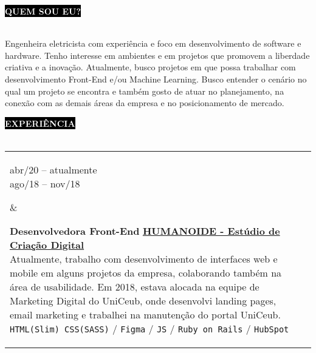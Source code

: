\documentclass[10pt,A4]{article}
\makeatletter
\newcounter{a}
\newcounter{b}
\newcounter{c}
\newcommand{\cvsection}[1] {
	\textcolor{white}{\MakeUppercase{\textbf{#1}}}
}
\newcommand{\cvsect}[1]{
	\colorbox{black}{{\cvsection{#1}}}\\\\%
}
\newenvironment{entrylist}{%
	\begin{tabular*}{\textwidth}[t]{@{\extracolsep{\fill}}ll}
	}{%
	\end{tabular*}
}
\newcommand{\entry}[4]{%
	\parbox[t]{3.5cm}{%
		#1%
	}%
	&\parbox[t]{14cm}{%
		\textbf{#2}%
		\hfill%
		{\footnotesize \textbf{\textcolor{black}{#3}}}\\%
		#4%
	}\\\\}
\newcommand{\slashsep}{
	\hspace{2mm}/\hspace{2mm}
}
\makeatother
\begin{document}
	\cvsect{Quem sou eu?}%
	\begin{minipage}[t]{1.03\textwidth}%
		Engenheira eletricista com experiência e foco em desenvolvimento de software e hardware. Tenho interesse em ambientes e em projetos que promovem a liberdade criativa e a inovação. Atualmente, busco projetos em que possa trabalhar com desenvolvimento Front-End e/ou Machine Learning. Busco entender o cenário no qual um projeto se encontra e também gosto de atuar no planejamento, na conexão com as demais áreas da empresa e no posicionamento de mercado.\\
	\end{minipage}%
	\hfill
	\cvsect{Experiência}
	\begin{entrylist}
		\entry
		{abr/20 – atualmente\\\footnotesize{ago/18 – nov/18}}
		{Desenvolvedora Front-End}
		{\href{https://humanoide.co/}{HUMANOIDE - Estúdio de Criação Digital}}
		{Atualmente, trabalho com desenvolvimento de interfaces web e mobile em alguns projetos da empresa, colaborando também na área de usabilidade. Em 2018, estava alocada na equipe de Marketing Digital do UniCeub, onde desenvolvi landing pages, email marketing e trabalhei na manutenção do portal UniCeub.\\
			\texttt{HTML(Slim) CSS(SASS)} \slashsep\texttt{Figma}\slashsep\texttt{JS}\slashsep\texttt{Ruby on Rails}\slashsep\texttt{HubSpot}}
		\entry
		{jan/20 – mai/20\\\footnotesize{dez/17 - abr/18}}
		{Engenheira de Desenvolvimento}
		{\href{https://gembrap.com/}{GEMBRAP S.A. - Geradores de energia e motores}}
		{Desenvolvimento de motores elétricos de baixo consumo para ventiladores, compressores e exaustores, atuando principalmente na área de eletrônica de potência.\\
			\texttt{Eletrônica de potência}\slashsep\texttt{Prototipagem}\slashsep\texttt{SCRUM}\slashsep\texttt{Impressão 3D}}
		\entry
		{dez/16 – jul/19\\}
		{Co-fundadora e desenvolvedora}
		{\href{https://www.instagram.com/roadiebot/?hl=pt-br}{ROADIEBOT - Tecnologia para música}}
		{Participei de todo o processo de validação e construção da empresa, além de participar da gestão de desenvolvimento, desenvolvimento full-stack do app desktop e do hardware de automação.\\
			\texttt{node.js}\slashsep\texttt{ElectronJS}\slashsep\texttt{HTML CSS JQuery}\slashsep\texttt{Python}\slashsep\texttt{Arduino}\slashsep\texttt{Impressão 3D}\slashsep\texttt{Empreendedorismo científico}}
		\entry
		{nov/18 – mar/19\\}
		{Desenvolvedora Java Jr.}
		{\href{https://www.techis.inf.br/}{TECHIS Intelligent Solutions - Monitoramento de Transporte}}
		{Trabelhei na concepção, planejamento e homologação do novo produto da empresa, operando na integração entre o desenvolvimento de hardware (localizador de caminhão) e de software (sistema de monitoramento e gestão), em conjunto com empresa parceira.\\
			\texttt{Java}\slashsep\texttt{Arduino}\slashsep\texttt{Design Sprint}}
	\end{entrylist}
\end{document}
